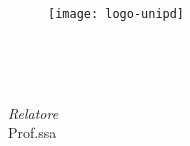 
\begin{titlepage}

\begin{center}

\begin{LARGE}
\textbf{\myUni}\\
\end{LARGE}

\vspace{10pt}

\begin{Large}
\textsc{\myDepartment}\\
\end{Large}

\vspace{10pt}

\begin{large}
\textsc{\myFaculty}\\
\end{large}

\vspace{30pt}
\begin{figure}[htbp]
\begin{center}
\texttt{[image: logo-unipd]}
\end{center}
\end{figure}
\vspace{30pt} 

\begin{LARGE}
\begin{center}
\textbf{\myTitle}\\
\end{center}
\end{LARGE}

\vspace{10pt} 

\begin{large}
\textsl{\myDegree}\\
\end{large}

\vspace{160pt} 

\par
\noindent
\begin{minipage}[t]{0.47\textwidth}
{\large{
\textit{Relatore}\\ 
Prof.ssa \myProf}} \\
                 

\end{minipage}
\end{center}
\end{titlepage}
